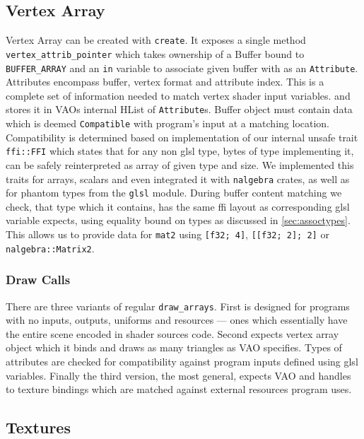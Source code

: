 \subsection{Vertex Array}

Vertex Array can be created with \texttt{create}. It exposes a single method \texttt{vertex\_attrib\_pointer} which takes ownership of a Buffer bound to \texttt{BUFFER\_ARRAY}
and an \texttt{in} variable to associate given buffer with as an \texttt{Attribute}.
Attributes encompass buffer, vertex format and attribute index. This is a complete set of information needed to match vertex shader input variables.
and stores it in VAOs internal HList of \texttt{Attribute}s. 
Buffer object must contain data which is deemed \texttt{Compatible} with program's input at a matching location.
Compatibility is determined based on implementation of our internal unsafe trait \texttt{ffi::FFI} which states that for any non glsl type, bytes of type implementing it,
can be safely reinterpreted as array of given type and size. 
We implemented this traits for arrays, scalars and even integrated it with \texttt{nalgebra} crates,
as well as for phantom types from the \texttt{glsl} module.
During buffer content matching we check, that type which it contains, has the same ffi layout as corresponding glsl variable expects, using equality bound on types as discussed in \ref{sec:assoctypes}.
This allows us to provide data for \texttt{mat2} using \texttt{[f32; 4]}, \texttt{[[f32; 2]; 2]} or \texttt{nalgebra::Matrix2}.

\subsubsection{Draw Calls}

There are three variants of regular \texttt{draw\_arrays}. First is designed for programs with no inputs, outputs, uniforms and resources --- ones which essentially have the entire scene
encoded in shader sources code. 
Second expects vertex array object which it binds and draws as many triangles as VAO specifies. Types of attributes are checked for compatibility against program inputs defined using glsl variables.
Finally the third version, the most general, expects VAO and handles to texture bindings which are matched against external resources program uses. 

\subsection{Textures}

